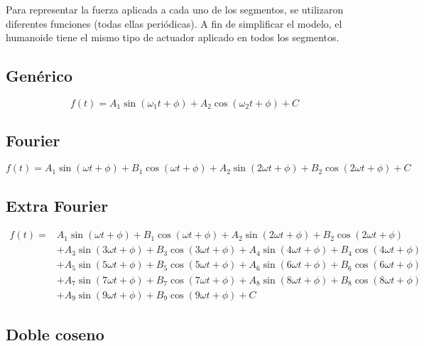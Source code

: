 \documentclass{article}
\begin{document}
Para representar la fuerza aplicada a cada uno de los segmentos, se utilizaron diferentes funciones (todas ellas peri\'odicas). A fin de simplificar el modelo, el humanoide tiene el mismo tipo de actuador aplicado en todos los segmentos.

\subsection{Gen\'erico}

\begin{equation}
  f(t) =  A_1 \sin(\omega_1t+\phi)+A_2 \cos(\omega_2t+\phi)+C
\end{equation}

\subsection{Fourier}

\begin{equation}
  f(t) =  A_1 \sin(\omega t+\phi)+B_1 \cos(\omega t+\phi)+A_2 \sin(2\omega t+\phi)+B_2 \cos(2\omega t+\phi)+C
\end{equation}

\subsection{Extra Fourier}

\begin{equation}
\begin{split}
  f(t) = &   A_1 \sin(\omega t+\phi)+B_1 \cos(\omega t+\phi)+A_2 \sin(2\omega t+\phi)+B_2 \cos(2\omega t+\phi) \\
  &+A_3 \sin(3\omega t+\phi)+B_3 \cos(3\omega t+\phi)+A_4 \sin(4\omega t+\phi)+B_4 \cos(4\omega t+\phi) \\ 
  &+A_5 \sin(5\omega t+\phi)+B_5 \cos(5\omega t+\phi)+A_6 \sin(6\omega t+\phi)+B_6 \cos(6\omega t+\phi) \\
  &+A_7 \sin(7\omega t+\phi)+B_7 \cos(7\omega t+\phi)+A_8 \sin(8\omega t+\phi)+B_8 \cos(8\omega t+\phi) \\
  &+A_9 \sin(9\omega t+\phi)+B_9 \cos(9\omega t+\phi) + C
\end{split}
\end{equation}

\subsection{Doble coseno}
\end{document}
